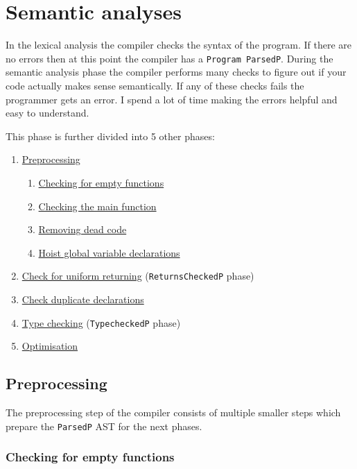 \documentclass{report}
\begin{document}
\chapter{Semantic analyses}

In the lexical analysis the compiler checks the syntax of the program. If there are no errors then at this point the compiler has a \texttt{Program ParsedP}. During the semantic analysis phase the compiler performs many checks to figure out if your code actually makes sense semantically. If any of these checks fails the programmer gets an error. I spend a lot of time making the errors helpful and easy to understand. 

This phase is further divided into 5 other phases:

\begin{enumerate}
    \item \hyperref[sec:Prep]{Preprocessing}
        \begin{enumerate}
            \item \hyperref[sec:Checking-bodies]{Checking for empty functions}
            \item \hyperref[sec:Checking-main]{Checking the main function}
            \item \hyperref[sec:Removing-dead-code]{Removing dead code}
            \item \hyperref[sec:Hoist-globals]{Hoist global variable declarations}
        \end{enumerate}
    \item \hyperref[sec:Check-Returns]{Check for uniform returning} (\texttt{ReturnsCheckedP} phase)
    \item \hyperref[sec:Check-duplicate-decls]{Check duplicate declarations}
    \item \hyperref[sec:Type-Checking]{Type checking} (\texttt{TypecheckedP} phase)
    \item \hyperref[sec:Optimisation]{Optimisation}
\end{enumerate}

\section{Preprocessing}  \label{sec:Preprocessing}

The preprocessing step of the compiler consists of multiple smaller steps which prepare the \texttt{ParsedP} AST for the next phases.

\subsection{Checking for empty functions} \label{sec:Checking-bodies}
\end{document}
